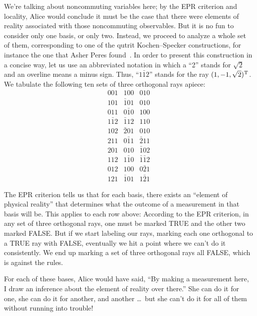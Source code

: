 \documentclass[aps,pra,superscriptaddress,12pt,tightenlines,nofootinbib]{revtex4-2}
\begin{document}
We're talking about noncommuting variables here; by the EPR criterion
and locality, Alice would conclude it must be the case that there were
elements of reality associated with those noncommuting observables.
But it is no fun to consider only one basis, or only two.  Instead, we
proceed to analyze a whole set of them, corresponding to one of the
qutrit Kochen--Specker constructions, for instance the one that Asher
Peres found~\cite{Peres95}.  In order to present this construction in
a concise way, let us use an abbreviated notation in which a ``2''
stands for $\sqrt{2}$ and an overline means a minus sign.  Thus,
``$1\bar{1}2$'' stands for the ray $(1, -1, \sqrt{2})^{\rm T}$.  We
tabulate the following ten sets of three orthogonal rays apiece:
\begin{equation}
\begin{array}{ccc}
001 & 100 & 010 \\
101 & \bar{1}01 & 010 \\
011 & 0\bar{1}0 & 100 \\
1\bar{1}2 & \bar{1}12 & 110 \\
102 & \bar{2}01 & 010 \\
211 & 0\bar{1}1 & \bar{2}11 \\
201 & 010 & \bar{1}02 \\
112 & 1\bar{1}0 & \bar{1}\bar{1}2 \\
012 & 100 & 0\bar{2}1 \\
121 & \bar{1}01 & 1\bar{2}1
\end{array}
\end{equation}

The EPR criterion tells us that for each basis, there exists an
``element of physical reality'' that determines what the outcome of a
measurement in that basis will be.  This applies to each row above:
According to the EPR criterion, in any set of three orthogonal rays,
one must be marked TRUE and the other two marked FALSE.  But if we start
labeling our rays, marking each one orthogonal to a TRUE ray with FALSE,
eventually we hit a point where we can't do it consistently.  We end
up marking a set of three orthogonal rays all FALSE, which is against the
rules.

For each of these bases, Alice would have said, ``By making a
measurement here, I draw an inference about the element of reality
over there.''  She can do it for one, she can do it for another, and
another \ldots\ but she can't do it for all of them without running
into trouble!
\end{document}
